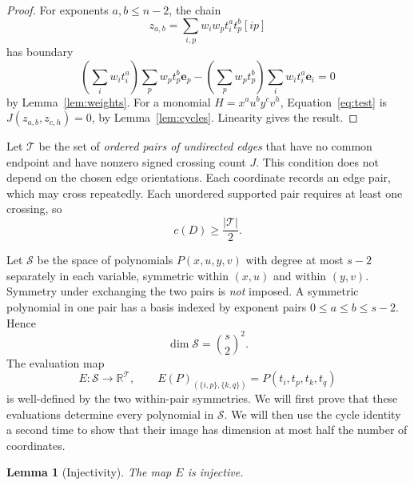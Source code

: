 \documentclass[11pt,a4paper]{article}
\newtheorem{lemma}[theorem]{Lemma}
\theoremstyle{remark}
\numberwithin{equation}{section}
\newcommand{\R}{\mathbb R}
\newcommand{\SSS}{\mathcal S}
\newcommand{\TT}{\mathcal T}
\newcommand{\ee}{\mathbf e}
\begin{document}
\begin{proof}
For exponents \(a,b\le n-2\), the chain
\[
z_{a,b}=\sum_{i,p}w_iw_p t_i^a t_p^b[ip]
\]
has boundary
\[
\left(\sum_iw_i t_i^a\right)\sum_pw_p t_p^b\ee_p
-
\left(\sum_pw_p t_p^b\right)\sum_iw_i t_i^a\ee_i=0
\]
by Lemma~\ref{lem:weights}. For a monomial
\(H=x^au^by^cv^h\), Equation~\eqref{eq:test} is
\(J(z_{a,b},z_{c,h})=0\), by Lemma~\ref{lem:cycles}.
Linearity gives the result.
\end{proof}

Let \(\TT\) be the set of \emph{ordered pairs of undirected edges}
that have no common endpoint and have nonzero signed crossing
count \(J\). This condition does not depend on the chosen edge
orientations. Each coordinate records an edge pair, which may cross
repeatedly.
Each unordered supported pair requires at least
one crossing, so
\begin{equation}\label{eq:support}
c(D)\ge\frac{|\TT|}{2}.
\end{equation}

Let \(\SSS\) be the space of polynomials \(P(x,u,y,v)\) with
degree at most \(s-2\) separately in each variable, symmetric
within \((x,u)\) and within \((y,v)\). Symmetry under exchanging
the two pairs is \emph{not} imposed. A symmetric polynomial
in one pair has a basis indexed by exponent pairs
\(0\le a\le b\le s-2\). Hence
\begin{equation}\label{eq:dim}
\dim\SSS=\binom{s}{2}^{\!2}.
\end{equation}
The evaluation map
\[
E:\SSS\longrightarrow\R^\TT,\qquad
E(P)_{(\{i,p\},\{k,q\})}=P(t_i,t_p,t_k,t_q)
\]
is well-defined by the two within-pair symmetries. We will first prove
that these evaluations determine every polynomial in \(\SSS\). We will
then use the cycle identity a second time to show that their image
has dimension at most half the number of coordinates.

\begin{lemma}[Injectivity]\label{lem:injectivity}
The map \(E\) is injective.
\end{lemma}
\end{document}

